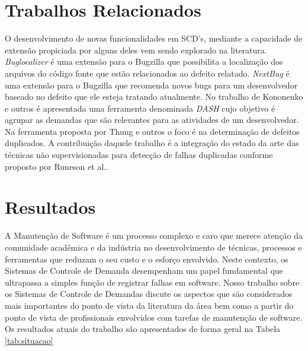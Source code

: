 \documentclass[12pt]{article}
\begin{document}
\section{Trabalhos Relacionados}
O desenvolvimento de novas funcionalidades em SCD's, mediante a capacidade de
extensão propiciada por alguns deles vem sendo explorado na
literatura. \textit{Buglocalizer} \cite{Thung:2014:BIT:2635868.2661678} é uma
extensão para o Bugzilla que possibilita a localização dos arquivos do código fonte que estão relacionados ao defeito relatado. \textit{NextBug} \cite{101186} é uma extensão para o Bugzilla que
recomenda novos bugs para um desenvolvedor baseado no defeito que ele esteja
tratando atualmente. No trabalho de Kononenko e outros \cite{Kononenko:2014:DED:2591062.2591075} é
apresentada uma ferramenta denominada \textit{DASH} cujo objetivo é agrupar as
demandas que são relevantes para as atividades de um desenvolvedor. Na ferramenta proposta por Thung e outros \cite{Thung:2014:DIT:2642937.2648627} o foco é na determinação de defeitos duplicados. A contribuição daquele trabalho é a integração do estado da arte das técnicas não supervisionadas para detecção de
falhas duplicadas conforme proposto por Runeson et al.\cite{Runeson:2007:DDD:1248820.1248882}.


\section{Resultados}
A Manutenção de Software é um processo complexo e caro que merece atenção da
comunidade acadêmica e da indústria no desenvolvimento de técnicas, processos e
ferramentas que reduzam o seu custo e o esforço envolvido. Neste contexto, os
Sistemas de Controle de Demanda desempenham um papel fundamental que ultrapassa
a simples função de registrar falhas em software. Nosso trabalho sobre os Sistemas de Controle de Demandas discute os aspectos que são considerados mais importantes do ponto de vista da literatura da área bem como a partir do ponto de vista de profissionais envolvidos com tarefas de manutenção de software. Os resultados atuais do trabalho são apresentados de forma geral na Tabela \ref{tab:situacao}
\end{document}
